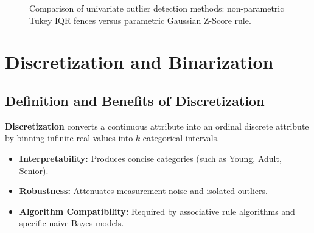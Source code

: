 \begin{figure}[H]
{%
}
\caption{Comparison of univariate outlier detection methods: non-parametric Tukey IQR fences versus parametric Gaussian Z-Score rule.}
\label{fig:outlier-detection-methods}
\end{figure}

\FloatBarrier

\section{Discretization and Binarization}

\subsection{Definition and Benefits of Discretization}
\textbf{Discretization} converts a continuous attribute into an ordinal discrete attribute by binning infinite real values into $k$ categorical intervals.

\begin{itemize}
    \item \textbf{Interpretability:} Produces concise categories (such as Young, Adult, Senior).
    \item \textbf{Robustness:} Attenuates measurement noise and isolated outliers.
    \item \textbf{Algorithm Compatibility:} Required by associative rule algorithms and specific naive Bayes models.
\end{itemize}


